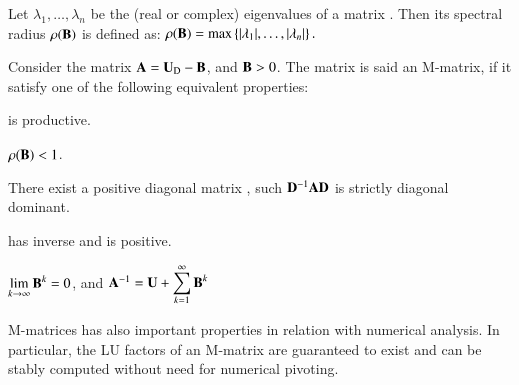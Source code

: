 \documentclass{ecos2018}
\begin{document}
Let $\lambda _{1},\dotsc ,\lambda _{n}$ be the (real or complex) eigenvalues of a matrix . Then its spectral radius $\rho(\mathbf{B})$ is defined as:
\(\displaystyle \rho (\mathbf{B})=\max \left\{|\lambda _{1}|,\dotsc ,|\lambda _{n}|\right\}.\)

Consider the matrix $\mathbf{A}=\mathbf{U}_\mathrm{D}-\mathbf{B}$, and $\mathbf{B}>0$. The matrix  is said an M-matrix, if it satisfy one of the following equivalent properties:
\begin{compactenum}[(i)]
	\item {} is productive.
	\item $\rho(\mathbf{B})<1$.
	\item There exist a positive diagonal matrix , such $\mathbf{D}^{-1}\mathbf{A}\mathbf{D}$ is strictly diagonal dominant.
	\item {} has inverse and  is positive.
	\item $\displaystyle{\lim_{k\rightarrow\infty}\ensuremath{\mathbf{B}}^k=0}$, and
	$\mathbf{A}^{-1}=\mathbf{U}+\displaystyle{\sum_{k=1}^{\infty}{\ensuremath{\mathbf{B}}^{k}}}$
\end{compactenum}
M-matrices has also important properties in relation with numerical analysis. In particular, the LU factors of an M-matrix are guaranteed to exist and can be stably computed
without need for numerical pivoting.
\end{document}
